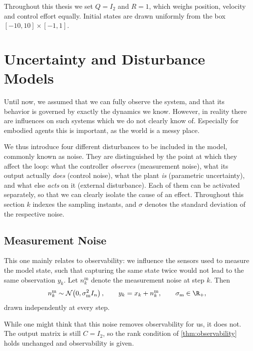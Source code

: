 Throughout this thesis we set $Q = I_2$ and $R = 1$, which weighs position,
velocity and control effort equally. Initial states are drawn uniformly from the
box $[-10, 10] \times [-1, 1]$.

\section{Uncertainty and Disturbance Models}
\label{sec:uncertainty}

Until now, we assumed that we can fully observe the system, and that its
behavior is governed by exactly the dynamics we know. However, in reality there
are influences on such systems which we do not clearly know of. Especially for
embodied agents this is important, as the world is a messy place.

We thus introduce four different disturbances to be included in the model,
commonly known as noise. They are distinguished by the point at which they
affect the loop: what the controller \emph{observes} (measurement noise),
what its output actually \emph{does} (control noise), what the plant
\emph{is} (parametric uncertainty), and what else \emph{acts} on it
(external disturbance). Each of them can be activated separately, so that we
can clearly isolate the cause of an effect. Throughout this section
$k$ indexes the sampling instants, and $\sigma$ denotes the standard deviation
of the respective noise.

\subsection{Measurement Noise}
\label{subsec:measurement-noise}

This one mainly relates to observability: we influence the sensors used to measure
the model state, such that capturing the same state twice would
not lead to the same observation $y_k$. 
Let $n^{\mathrm{m}}_k$ denote the measurement noise at step $k$. Then
\begin{equation}
    \label{eq:measurement-noise}
    n^{\mathrm{m}}_k \sim \mathcal{N}\!\left(0, \sigma_{\mathrm{m}}^{2} I_n\right),
    \qquad
    y_k = x_k + n^{\mathrm{m}}_k ,
    \qquad \sigma_{\mathrm{m}} \in \R_{+} ,
\end{equation}
drawn independently at every step.

While one might think that this noise removes observability for us, it does not.
The output matrix is still $C = I_2$, 
so the rank condition of \cref{thm:observability} holds
unchanged and observability is given. 

